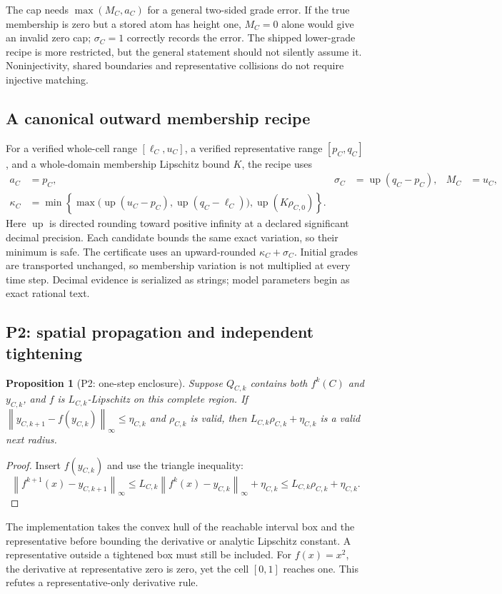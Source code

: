 \documentclass[10pt,a4paper]{article}
\newtheorem{proposition}{Proposition}
\newcommand{\up}{\operatorname{up}}
\newcommand{\norm}[1]{\left\lVert#1\right\rVert_{\infty}}
\begin{document}
The cap needs $\max(M_C,a_C)$ for a general two-sided grade error. If the true
membership is zero but a stored atom has height one, $M_C=0$ alone would give
an invalid zero cap; $\sigma_C=1$ correctly records the error. The shipped
lower-grade recipe is more restricted, but the general statement should not
silently assume it. Noninjectivity, shared boundaries and representative
collisions do not require injective matching.

\subsection{A canonical outward membership recipe}
For a verified whole-cell range $[\ell_C,u_C]$, a verified representative range
$[p_C,q_C]$, and a whole-domain membership Lipschitz bound $K$, the recipe uses
\begin{align}
 a_C&=p_C,&\sigma_C&=\up(q_C-p_C),&M_C&=u_C,\\
 \kappa_C&=\min\left\{
  \max\bigl(\up(u_C-p_C),\up(q_C-\ell_C)\bigr),
  \up(K\rho_{C,0})\right\}.
\end{align}
Here $\up$ is directed rounding toward positive infinity at a declared
significant decimal precision. Each candidate bounds the same exact variation,
so their minimum is safe. The certificate uses an upward-rounded
$\kappa_C+\sigma_C$. Initial grades are transported unchanged, so membership
variation is not multiplied at every time step. Decimal evidence is serialized
as strings; model parameters begin as exact rational text.

\subsection{P2: spatial propagation and independent tightening}
\begin{proposition}[P2: one-step enclosure]
Suppose $Q_{C,k}$ contains both $f^k(C)$ and $y_{C,k}$, and $f$ is
$L_{C,k}$-Lipschitz on this complete region. If
$\norm{y_{C,k+1}-f(y_{C,k})}\leq\eta_{C,k}$ and $\rho_{C,k}$ is valid,
then $L_{C,k}\rho_{C,k}+\eta_{C,k}$ is a valid next radius.
\end{proposition}
\begin{proof}
Insert $f(y_{C,k})$ and use the triangle inequality:
\[
 \norm{f^{k+1}(x)-y_{C,k+1}}
 \leq L_{C,k}\norm{f^k(x)-y_{C,k}}+\eta_{C,k}
 \leq L_{C,k}\rho_{C,k}+\eta_{C,k}.
\]
\end{proof}
The implementation takes the convex hull of the reachable interval box and
the representative before bounding the derivative or analytic Lipschitz
constant. A representative outside a tightened box must still be included.
For $f(x)=x^2$, the derivative at representative zero is zero, yet the cell
$[0,1]$ reaches one. This refutes a representative-only derivative rule.
\end{document}
